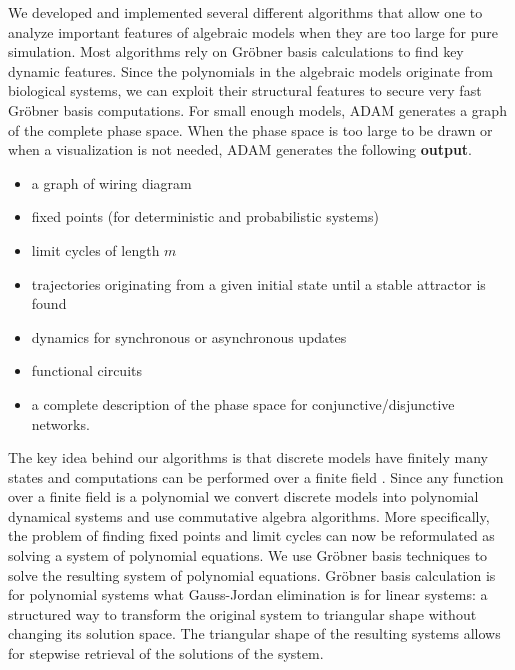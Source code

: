 \documentclass[11pt]{amsart}
\begin{document}
We developed and implemented several different algorithms that allow one to analyze
important features of algebraic models when they are too large for pure simulation.
Most algorithms rely on Gr\"obner basis calculations to find key dynamic
features.
Since the polynomials in the algebraic
models originate from biological systems, we can exploit their structural
features to secure very fast Gr\"obner basis computations.
For small enough models, ADAM generates a graph of the complete phase space.
When the phase space is too large to be drawn or when a visualization is not
needed, ADAM generates the following {\bf output}.
\begin{itemize}
  \item a graph of wiring diagram
  \item fixed points (for deterministic and probabilistic systems)
  \item limit cycles of length $m$
  \item trajectories originating from a given initial state until a stable
  attractor is found
  \item dynamics for synchronous or asynchronous updates
  \item functional circuits
  \item a complete description of the phase space for conjunctive/disjunctive
  networks.
\end{itemize}

The key idea behind our algorithms is that discrete models have finitely many states and computations 
can be performed over a finite field \cite{Alan:Bioinf2010,
Hinkelmann:2010}. Since any function over a finite field is a polynomial
\cite{Lidl:1997} we convert discrete models into polynomial dynamical systems
and use commutative algebra algorithms. More specifically, the problem of finding fixed points and limit cycles
can now be reformulated as solving a system of polynomial equations. We use Gr\"{o}bner basis techniques to solve the 
resulting system of polynomial equations. Gr\"obner basis calculation is for polynomial systems what
Gauss-Jordan elimination is for linear systems: a structured way to transform
the original system to triangular shape without changing its solution space.
The triangular shape of the resulting systems allows for stepwise retrieval of  the solutions of the system.



\end{document}

